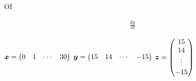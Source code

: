 \documentclass[a4paper, 11pt]{article}
\begin{document}
	
	OI
	
				
		
	
	\begin{gather}
		\frac{dx}{dt}
	\end{gather}
	\vspace{-.2cm}
	\begin{center}
		$\vectorsym{x}=
		\begin{pmatrix}
			0 & 1 & \cdots & 30
		\end{pmatrix}$
		\hspace{.5cm}
		$\vectorsym{y}=
		\begin{pmatrix}
			15 & 14 & \cdots & -15
		\end{pmatrix}$
		\hspace{.5cm}
		$\vectorsym{z}=
		\begin{pmatrix}
			15 \\
			14 \\
			\vdots \\
			-15
		\end{pmatrix}$
	\end{center}
	
	
\end{document}
